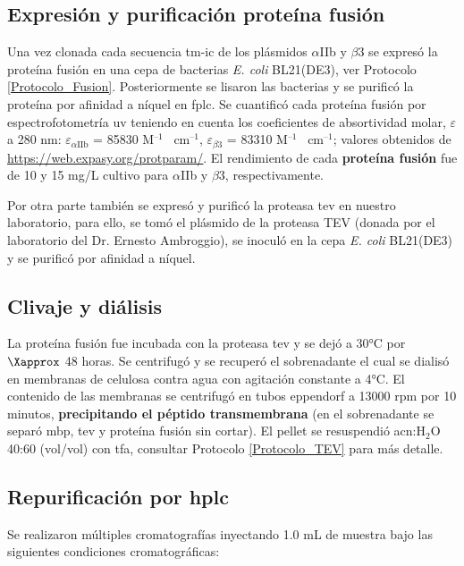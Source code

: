 \subsection{Expresión y purificación proteína fusión}\label{sec:expre_akta}

Una vez clonada cada secuencia \ac{tm}-\ac{ic} de los plásmidos $\alpha$IIb y $\beta$3 se expresó la proteína fusión en una cepa de bacterias \emph{E. coli} BL21(DE3), ver Protocolo \ref{Protocolo_Fusion}. Posteriormente se lisaron las bacterias y se purificó la proteína por afinidad a níquel en \ac{fplc}. 
Se cuantificó cada proteína fusión por espectrofotometría \ac{uv} teniendo en cuenta los coeficientes de absortividad molar, {\Large{$\varepsilon$}} a 280 nm: {\Large{$\varepsilon$}}$_{\alpha \text{IIb}}$ = 85830 M$^{\text{--1}}$ \, cm$^{\text{--1}}$, {\Large{$\varepsilon$}}$_{\beta\text{3}}$ = 83310 M$^{\text{--1}}$ \, cm$^{\text{--1}}$;
 valores obtenidos de \url{https://web.expasy.org/protparam/}. El rendimiento de cada \textbf{proteína fusión} fue de 10 y 15 mg/L cultivo para $\alpha$IIb y $\beta$3,  respectivamente.

Por otra parte también se expresó y purificó la proteasa \ac{tev} en nuestro laboratorio,  para ello, se tomó el plásmido de la proteasa TEV (donada por el laboratorio del Dr. Ernesto Ambroggio), se inoculó en la cepa \emph{E. coli} BL21(DE3) y se purificó por afinidad a níquel.

\subsection{Clivaje y diálisis}

La proteína fusión fue incubada con la proteasa \ac{tev} y se dejó a 30°C por $\Xapprox$ 48 horas. Se centrifugó y  se recuperó el sobrenadante el cual se dialisó en membranas de celulosa contra agua con agitación constante a 4°C. El contenido de las membranas se centrifugó en tubos eppendorf a 13000 \ac{rpm} por 10 minutos, \textbf{precipitando el péptido transmembrana} (en el sobrenadante se separó \ac{mbp}, \ac{tev} y proteína fusión sin cortar). El pellet se resuspendió \ac{acn}:H$_{2}$O 40:60 (vol/vol) con \ac{tfa}, consultar Protocolo \ref{Protocolo_TEV} para más detalle.

\subsection{Repurificación por \ac{hplc}}
Se realizaron múltiples cromatografías inyectando 1.0 mL de muestra bajo las siguientes condiciones cromatográficas:


